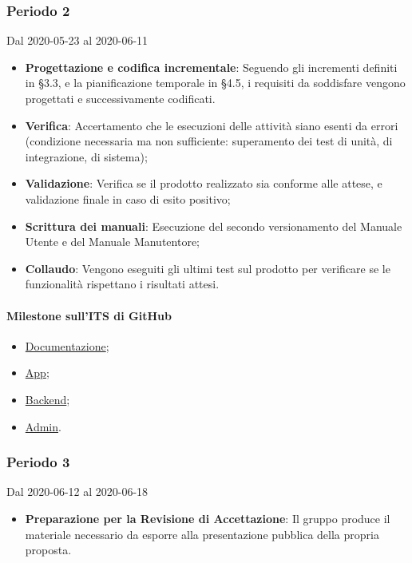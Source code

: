 \subsubsection{Periodo 2} 
Dal 2020-05-23 al 2020-06-11
\begin{itemize}
	\item \textbf{Progettazione e codifica incrementale}: Seguendo gli incrementi definiti in §3.3, e la pianificazione temporale in §4.5, i requisiti da soddisfare vengono progettati e successivamente codificati.
	\item \textbf{Verifica}: Accertamento che le esecuzioni delle attività siano esenti da errori (condizione necessaria ma non sufficiente: superamento dei test di unità, di integrazione, di sistema);
	\item \textbf{Validazione}: Verifica se il prodotto realizzato sia conforme alle attese, e validazione finale in caso di esito positivo;
	\item \textbf{Scrittura dei manuali}: Esecuzione del secondo versionamento del Manuale Utente e del Manuale Manutentore;
	\item \textbf{Collaudo}: Vengono eseguiti gli ultimi test sul prodotto per verificare se le funzionalità rispettano i risultati attesi.
\end{itemize}
\paragraph{Milestone sull'ITS di GitHub}
\begin{itemize}
	\item \href{https://github.com/qb-team/Stalker-Documentazione/milestone/16}{Documentazione};
	\item \href{https://github.com/qb-team/Stalker-App/milestone/5}{App};
	\item \href{https://github.com/qb-team/Stalker-Backend/milestone/6}{Backend};
	\item \href{https://github.com/qb-team/Stalker-Admin/milestone/6}{Admin}.
\end{itemize}

\subsubsection{Periodo 3} 
Dal 2020-06-12 al 2020-06-18
\begin{itemize}
	\item \textbf{Preparazione per la Revisione di Accettazione}: Il gruppo produce il materiale necessario da esporre alla presentazione pubblica della propria proposta.
\end{itemize}
